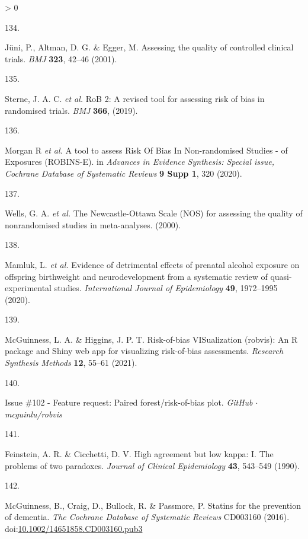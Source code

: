 \documentclass[a4paper, twoside]{templates/ociamthesis}
\newlength{\cslhangindent}
\newlength{\csllabelwidth}
\newenvironment{CSLReferences}[3] %
 {%
  \setlength{\parindent}{0pt}
  \ifodd #1 \everypar{\setlength{\hangindent}{\cslhangindent}}\ignorespaces\fi
  \ifnum #2 > 0
  \setlength{\parskip}{#2\baselineskip}
  \fi
 }%
 {}
\newcommand{\CSLLeftMargin}[1]{\parbox[t]{\maxof{\widthof{#1}}{\csllabelwidth}}{#1}}
\newcommand{\CSLRightInline}[1]{\parbox[t]{\linewidth - \csllabelwidth}{#1}}
\begin{document}
\begin{CSLReferences}{0}{0}
\leavevmode\hypertarget{ref-juni2001}{}%
\CSLLeftMargin{134. }
\CSLRightInline{Jüni, P., Altman, D. G. \& Egger, M. Assessing the quality of controlled clinical trials. \emph{BMJ} \textbf{323}, 42--46 (2001).}

\leavevmode\hypertarget{ref-sterne2019}{}%
\CSLLeftMargin{135. }
\CSLRightInline{Sterne, J. A. C. \emph{et al.} {RoB} 2: A revised tool for assessing risk of bias in randomised trials. \emph{BMJ} \textbf{366}, (2019).}

\leavevmode\hypertarget{ref-morganr2020}{}%
\CSLLeftMargin{136. }
\CSLRightInline{Morgan R \emph{et al.} A tool to assess {Risk Of Bias In Non}-randomised {Studies} - of {Exposures} ({ROBINS}-{E}). in \emph{Advances in {Evidence Synthesis}: Special issue, {Cochrane Database} of {Systematic Reviews}} \textbf{9 Supp 1}, 320 (2020).}

\leavevmode\hypertarget{ref-wells2000}{}%
\CSLLeftMargin{137. }
\CSLRightInline{Wells, G. A. \emph{et al.} The {Newcastle}-{Ottawa Scale} ({NOS}) for assessing the quality of nonrandomised studies in meta-analyses. (2000).}

\leavevmode\hypertarget{ref-mamluk2020}{}%
\CSLLeftMargin{138. }
\CSLRightInline{Mamluk, L. \emph{et al.} Evidence of detrimental effects of prenatal alcohol exposure on offspring birthweight and neurodevelopment from a systematic review of quasi-experimental studies. \emph{International Journal of Epidemiology} \textbf{49}, 1972--1995 (2020).}

\leavevmode\hypertarget{ref-mcguinness2020robvisPaper}{}%
\CSLLeftMargin{139. }
\CSLRightInline{McGuinness, L. A. \& Higgins, J. P. T. Risk-of-bias {VISualization} (robvis): {An R} package and {Shiny} web app for visualizing risk-of-bias assessments. \emph{Research Synthesis Methods} \textbf{12}, 55--61 (2021).}

\leavevmode\hypertarget{ref-zotero-14999}{}%
\CSLLeftMargin{140. }
\CSLRightInline{Issue \#102 - {Feature} request: Paired forest/risk-of-bias plot. \emph{GitHub {\(\cdot\)} mcguinlu/robvis}}

\leavevmode\hypertarget{ref-feinstein1990}{}%
\CSLLeftMargin{141. }
\CSLRightInline{Feinstein, A. R. \& Cicchetti, D. V. High agreement but low kappa: {I}. {The} problems of two paradoxes. \emph{Journal of Clinical Epidemiology} \textbf{43}, 543--549 (1990).}

\leavevmode\hypertarget{ref-mcguinness2016}{}%
\CSLLeftMargin{142. }
\CSLRightInline{McGuinness, B., Craig, D., Bullock, R. \& Passmore, P. Statins for the prevention of dementia. \emph{The Cochrane Database of Systematic Reviews} CD003160 (2016). doi:\href{https://doi.org/10.1002/14651858.CD003160.pub3}{10.1002/14651858.CD003160.pub3}}


\end{CSLReferences}
\end{document}
